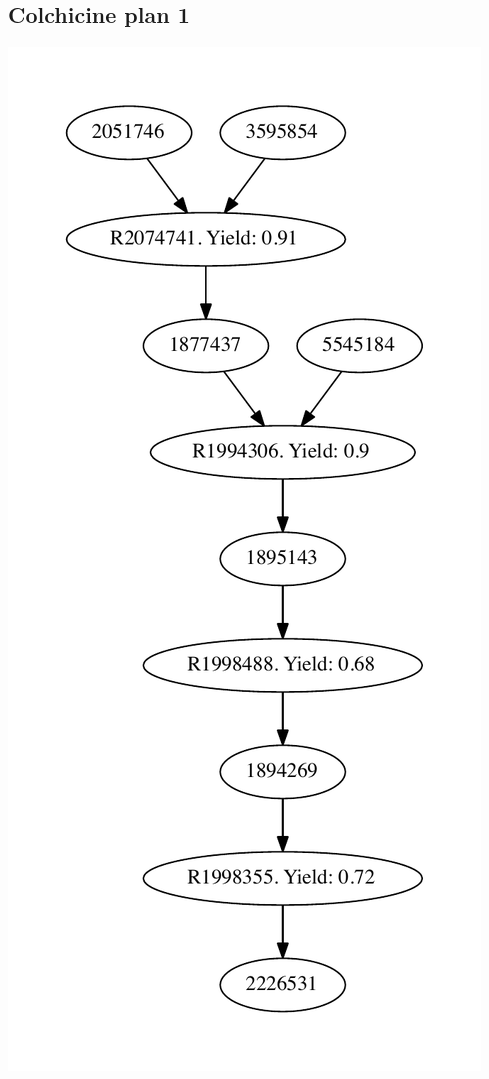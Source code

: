 \documentclass[a4paper,10pt,titlepage]{paper}
\begin{document}
\subsection{Colchicine plan 1}
\centering
\includegraphics[scale=0.4]{Synteseplaner/Colchicine/plan1.pdf}
\label{Appendix::Colchicine1}
\end{document}
